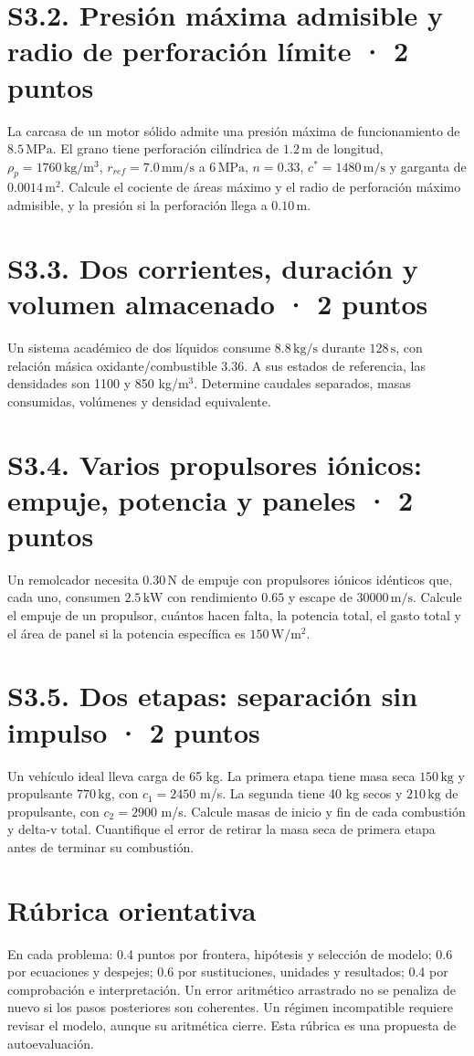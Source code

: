 \section{S3.2. Presión máxima admisible y radio de perforación límite · 2 puntos}
La carcasa de un motor sólido admite una presión máxima de funcionamiento de $8.5\,\mathrm{MPa}$. El grano tiene perforación cilíndrica de $1.2\,\mathrm m$ de longitud, $\rho_p=1760\,\mathrm{kg/m^3}$, $r_{ref}=7.0\,\mathrm{mm/s}$ a $6\,\mathrm{MPa}$, $n=0.33$, $c^*=1480\,\mathrm{m/s}$ y garganta de $0.0014\,\mathrm{m^2}$. Calcule el cociente de áreas máximo y el radio de perforación máximo admisible, y la presión si la perforación llega a $0.10\,\mathrm m$.

\section{S3.3. Dos corrientes, duración y volumen almacenado · 2 puntos}
Un sistema académico de dos líquidos consume $8.8\,\mathrm{kg/s}$ durante $128\,\mathrm{s}$, con relación másica oxidante/combustible $3.36$. A sus estados de referencia, las densidades son 1100 y 850 kg/m$^3$. Determine caudales separados, masas consumidas, volúmenes y densidad equivalente.

\section{S3.4. Varios propulsores iónicos: empuje, potencia y paneles · 2 puntos}
Un remolcador necesita $0.30\,\mathrm N$ de empuje con propulsores iónicos idénticos que, cada uno, consumen $2.5\,\mathrm{kW}$ con rendimiento $0.65$ y escape de $30000\,\mathrm{m/s}$. Calcule el empuje de un propulsor, cuántos hacen falta, la potencia total, el gasto total y el área de panel si la potencia específica es $150\,\mathrm{W/m^2}$.

\section{S3.5. Dos etapas: separación sin impulso · 2 puntos}
Un vehículo ideal lleva carga de 65 kg. La primera etapa tiene masa seca $150\,\mathrm{kg}$ y propulsante $770\,\mathrm{kg}$, con $c_1=2450$ m/s. La segunda tiene 40 kg secos y $210\,\mathrm{kg}$ de propulsante, con $c_2=2900$ m/s. Calcule masas de inicio y fin de cada combustión y delta-v total. Cuantifique el error de retirar la masa seca de primera etapa antes de terminar su combustión.

\section{Rúbrica orientativa} En cada problema: 0.4 puntos por frontera, hipótesis y selección de modelo; 0.6 por ecuaciones y despejes; 0.6 por sustituciones, unidades y resultados; 0.4 por comprobación e interpretación. Un error aritmético arrastrado no se penaliza de nuevo si los pasos posteriores son coherentes. Un régimen incompatible requiere revisar el modelo, aunque su aritmética cierre. Esta rúbrica es una propuesta de autoevaluación.
